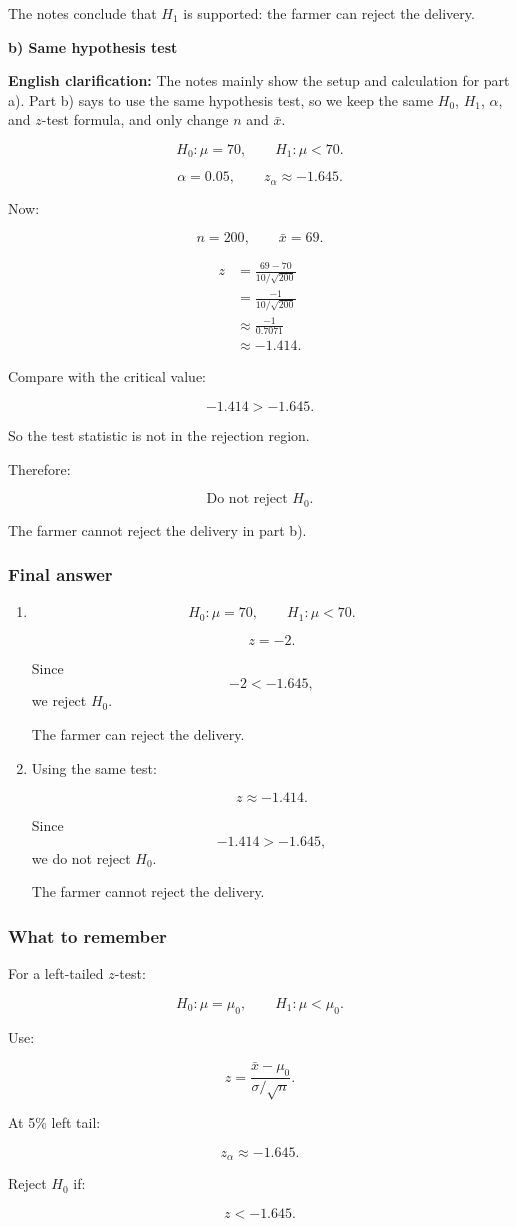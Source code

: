 \documentclass[10pt]{article}
\begin{document}
The notes conclude that \(H_1\) is supported:
the farmer can reject the delivery.

\textbf{b) Same hypothesis test}

\textbf{English clarification:}
The notes mainly show the setup and calculation for
part a). Part b) says to use the same hypothesis test,
so we keep the same \(H_0\), \(H_1\), \(\alpha\),
and \(z\)-test formula, and only change \(n\)
and \(\bar{x}\).

\[
H_0:\mu=70,
\qquad
H_1:\mu<70.
\]

\[
\alpha=0.05,
\qquad
z_\alpha\approx -1.645.
\]

Now:

\[
n=200,
\qquad
\bar{x}=69.
\]

\begin{align*}
z
&=
\frac{69-70}
{10/\sqrt{200}} \\[2mm]
&=
\frac{-1}
{10/\sqrt{200}} \\[2mm]
&\approx
\frac{-1}{0.7071} \\[2mm]
&\approx -1.414.
\end{align*}

Compare with the critical value:

\[
-1.414>-1.645.
\]

So the test statistic is not in the rejection region.

Therefore:

\[
\text{Do not reject } H_0.
\]

The farmer cannot reject the delivery in part b).

\subsubsection*{Final answer}
\begin{enumerate}[label=\alph*)]
\item
\[
H_0:\mu=70,
\qquad
H_1:\mu<70.
\]

\[
z=-2.
\]

Since
\[
-2<-1.645,
\]
we reject \(H_0\).

The farmer can reject the delivery.

\item
Using the same test:

\[
z\approx -1.414.
\]

Since
\[
-1.414>-1.645,
\]
we do not reject \(H_0\).

The farmer cannot reject the delivery.
\end{enumerate}

\subsubsection*{What to remember}
For a left-tailed \(z\)-test:

\[
H_0:\mu=\mu_0,
\qquad
H_1:\mu<\mu_0.
\]

Use:

\[
z=
\frac{\bar{x}-\mu_0}
{\sigma/\sqrt{n}}.
\]

At 5\% left tail:

\[
z_\alpha\approx -1.645.
\]

Reject \(H_0\) if:

\[
z<-1.645.
\]
\end{document}
